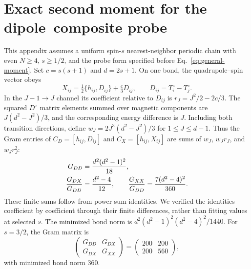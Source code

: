 \section{Exact second moment for the dipole--composite probe}
\label{app:general-moment}

This appendix assumes a uniform spin-$s$ nearest-neighbor periodic chain
with even $N\ge4$, $s\ge1/2$, and the probe form specified before
Eq.~\eqref{eq:general-moment}. Set $c=s(s+1)$ and $d=2s+1$.
On one bond, the quadrupole--spin vector obeys
\begin{equation}
 X_{ij}=\tfrac12\{h_{ij},D_{ij}\}+\tfrac{c}{3}D_{ij},
 \qquad D_{ij}=T_i^z-T_j^z.
\end{equation}
In the $J-1\to J$ channel its coefficient relative to $D_{ij}$ is
$r_J=J^2/2-2c/3$. The squared $D^z$ matrix elements summed over magnetic
components are $J(d^2-J^2)/3$, and the corresponding energy difference is
$J$. Including both transition directions, define
$w_J=2J^3(d^2-J^2)/3$ for $1\le J\le d-1$. Thus the Gram entries of
$C_D=[h_{ij},D_{ij}]$ and $C_X=[h_{ij},X_{ij}]$ are sums of
$w_J$, $w_Jr_J$, and $w_Jr_J^2$:
\begin{align}
 G_{DD}&=\frac{d^2(d^2-1)^2}{18},\notag\\
 \frac{G_{DX}}{G_{DD}}&=\frac{d^2-4}{12},\qquad
 \frac{G_{XX}}{G_{DD}}=\frac{7(d^2-4)^2}{360}.
 \label{eq:general-bond-gram}
\end{align}
These finite sums follow from power-sum identities. We verified the
identities coefficient by coefficient through their finite differences,
rather than fitting values at selected $s$. The minimized bond norm is
$d^2(d^2-1)^2(d^2-4)^2/1440$.
For $s=3/2$, the Gram matrix is
\begin{equation}
 \begin{pmatrix}G_{DD}&G_{DX}\\G_{DX}&G_{XX}\end{pmatrix}
 =\begin{pmatrix}200&200\\200&560\end{pmatrix},
 \label{eq:thermal-gram}
\end{equation}
with minimized bond norm $360$.

